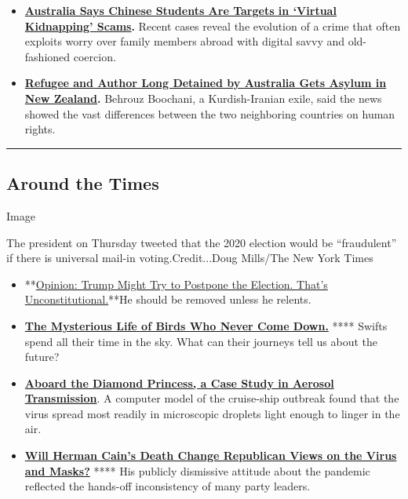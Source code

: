 \begin{itemize}
\item
  \textbf{\href{https://www.nytimes3xbfgragh.onion/2020/07/28/world/australia/chinese-students-virtual-kidnapping.html}{Australia
  Says Chinese Students Are Targets in `Virtual Kidnapping' Scams}.}
  Recent cases reveal the evolution of a crime that often exploits worry
  over family members abroad with digital savvy and old-fashioned
  coercion.
\item
  \textbf{\href{https://www.nytimes3xbfgragh.onion/2020/07/24/world/australia/behrouz-boochani-asylum-new-zealand.html}{Refugee
  and Author Long Detained by Australia Gets Asylum in New Zealand}.}
  Behrouz Boochani, a Kurdish-Iranian exile, said the news showed the
  vast differences between the two neighboring countries on human
  rights.
\end{itemize}

\begin{center}\rule{0.5\linewidth}{\linethickness}\end{center}

\hypertarget{around-the-times}{%
\subsection{Around the Times}\label{around-the-times}}

Image

The president on Thursday tweeted that the 2020 election would be
``fraudulent'' if there is universal mail-in voting.Credit...Doug
Mills/The New York Times

\begin{itemize}
\item
  **\href{https://www.nytimes3xbfgragh.onion/2020/07/30/opinion/trump-delay-election-coronavirus.html}{Opinion:
  Trump Might Try to Postpone the Election. That's
  Unconstitutional.}**He should be removed unless he relents.
\item
  \textbf{\href{https://www.nytimes3xbfgragh.onion/2020/07/29/magazine/vesper-flights.html?action=click\&module=Editors\%20Picks\&pgtype=Homepage}{The
  Mysterious Life of Birds Who Never Come Down.}} **** Swifts spend all
  their time in the sky. What can their journeys tell us about the
  future?
\item
  \textbf{\href{https://www.nytimes3xbfgragh.onion/2020/07/30/health/diamond-princess-coronavirus-aerosol.html}{Aboard
  the Diamond Princess, a Case Study in Aerosol Transmission}}. A
  computer model of the cruise-ship outbreak found that the virus spread
  most readily in microscopic droplets light enough to linger in the
  air.
\item
  \textbf{\href{https://www.nytimes3xbfgragh.onion/2020/07/30/us/politics/herman-cain-gop-coronavirus.html}{Will
  Herman Cain's Death Change Republican Views on the Virus and Masks?}}
  **** His publicly dismissive attitude about the pandemic reflected the
  hands-off inconsistency of many party leaders.
\end{itemize}

